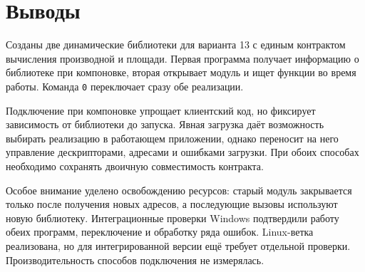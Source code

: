 \section{Выводы}
Созданы две динамические библиотеки для варианта 13 с единым контрактом вычисления производной и площади. Первая программа получает информацию о библиотеке при компоновке, вторая открывает модуль и ищет функции во время работы. Команда \texttt{0} переключает сразу обе реализации.

Подключение при компоновке упрощает клиентский код, но фиксирует зависимость от библиотеки до запуска. Явная загрузка даёт возможность выбирать реализацию в работающем приложении, однако переносит на него управление дескрипторами, адресами и ошибками загрузки. При обоих способах необходимо сохранять двоичную совместимость контракта.

Особое внимание уделено освобождению ресурсов: старый модуль закрывается только после получения новых адресов, а последующие вызовы используют новую библиотеку. Интеграционные проверки Windows подтвердили работу обеих программ, переключение и обработку ряда ошибок. Linux-ветка реализована, но для интегрированной версии ещё требует отдельной проверки. Производительность способов подключения не измерялась.

